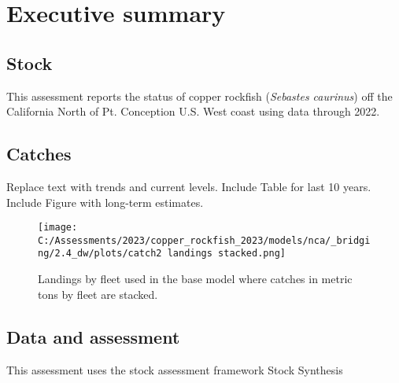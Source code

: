 \documentclass[11pt,
  english,
  letterpaper,
]{article}
\begin{document}
\newcommand{\lt}{\ensuremath <}
\newcommand{\gt}{\ensuremath >}

\pagebreak
{}
\setcounter{page}{1}

\renewcommand{\thetable}{\roman{table}}
\renewcommand{\thefigure}{\roman{figure}}

\setlength\parskip{0.5em plus 0.1em minus 0.2em}

\hypertarget{executive-summary}{%
\section*{Executive summary}\label{executive-summary}}

\hypertarget{stock}{%
\subsection*{Stock}\label{stock}}

This assessment reports the status of copper rockfish (\emph{Sebastes caurinus}) off the California North of Pt. Conception U.S. West coast using data through 2022.

\hypertarget{catches}{%
\subsection*{Catches}\label{catches}}

Replace text with trends and current levels. Include Table for last 10 years. Include Figure with long-term estimates.



\begin{figure}
\centering
\texttt{[image: C:/Assessments/2023/copper\_rockfish\_2023/models/nca/\_bridging/2.4\_dw/plots/catch2 landings stacked.png]}
\caption{Landings by fleet used in the base model where catches in metric tons by fleet are stacked.\label{fig:es-catch}}
\end{figure}

\hypertarget{data-and-assessment}{%
\subsection*{Data and assessment}\label{data-and-assessment}}

This assessment uses the stock assessment framework Stock Synthesis
\end{document}
